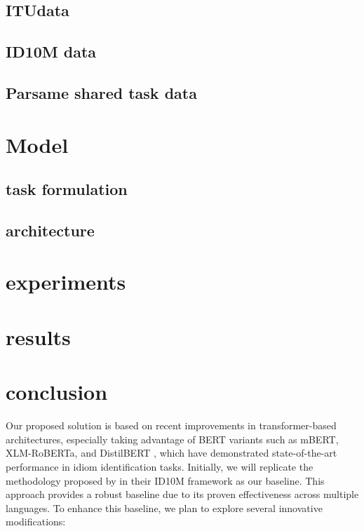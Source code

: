 \documentclass[11pt]{article}
\begin{document}
\subsection{ITUdata}

\subsection{ID10M data}

\subsection{Parsame shared task data}


\section{Model}


\subsection{task formulation}

\subsection{architecture}

\section{experiments}

\section{results}

\section{conclusion}

Our proposed solution is based on recent improvements in transformer-based architectures, especially taking advantage of BERT variants such as mBERT, XLM-RoBERTa, and DistilBERT \citealp{gamage2022bertidiom}, which have demonstrated state-of-the-art performance in idiom identification tasks. Initially, we will replicate the methodology proposed by \citealp{ID10M:2022} in their ID10M framework as our baseline. This approach provides a robust baseline due to its proven effectiveness across multiple languages. To enhance this baseline, we plan to explore several innovative modifications: 
\end{document}
